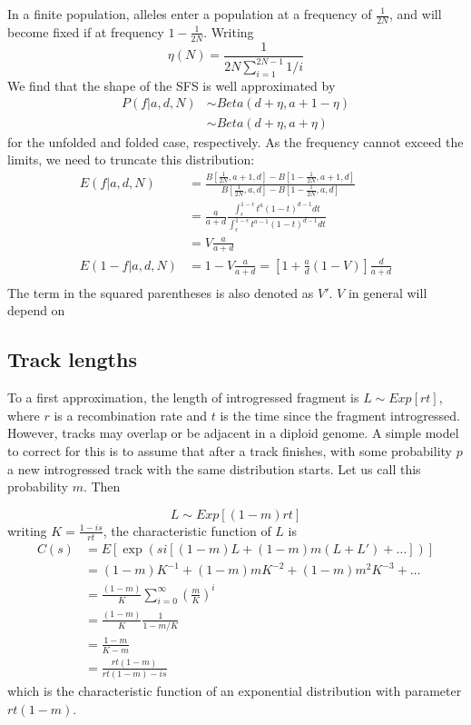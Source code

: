 \documentclass[10pt,a4paper]{article}
\begin{document}
In a finite population, alleles enter a population at a frequency of $\frac{1}{2N}$, and will become fixed if at frequency $1-\frac{1}{2N}$. Writing
$$\eta(N) = \frac{1}{2N \sum_{i=1}^{2N-1}1/i}$$
We find that the shape of the SFS is well approximated by 
\begin{align}
P(f | a, d, N) &\sim Beta(d + \eta, a+1 - \eta)\\
&\sim Beta(d + \eta, a + \eta)
\end{align}
for the unfolded and folded case, respectively. As the frequency cannot exceed the limits, we need to truncate this distribution:
\begin{align}
E(f | a, d, N) &= \frac{B[\frac{1}{2N}, a+1, d]-B[1-\frac{1}{2N}, a+1, d]}{B[\frac{1}{2N}, a, d]-B[1-\frac{1}{2N}, a, d]}\nonumber\\
&= \frac{a}{a+d} \frac{\int_\epsilon^{1-\epsilon} t^a(1-t)^{d-1}dt}
{\int_\epsilon^{1-\epsilon} t^{a-1}(1-t)^{d-1}dt}\nonumber\\
&= V \frac{a}{a+d}\\
E(1-f | a, d, N)&= 1-V\frac{a}{a+d} = \left[1 + \frac{a}{d} (1-V)\right] \frac{d}{a+d}\\
\end{align}
The term in the squared parentheses is also denoted as $V'$. $V$ in general will depend on 
		
\subsection{Track lengths}
To a first approximation, the length of introgressed fragment is 
$L \sim Exp[r t ]$, where $r$ is a recombination rate and $t$ is the time since the fragment introgressed. However, tracks may overlap or be adjacent in a diploid genome. A simple model to correct for this is to assume that after a track finishes, with some probability $p$ a new introgressed track with the same distribution starts. Let us call this probability $m$. Then

\begin{equation}
L \sim Exp[(1-m)rt]
\end{equation}
writing $K = \frac{1-is}{rt}$, the characteristic function of $L$ is
\begin{align}
C(s) &= E[\exp(si [(1-m)L + (1-m)m (L+L')+ \dots  ] )]\nonumber\\
&=(1-m) K^{-1} + (1-m)m K^{-2} +(1-m)m^2 K^{-3} + \dots\nonumber\\
&=\frac{(1-m)}{K} \sum_{i=0}^\infty \left(\frac{m}{K}\right)^{i} \nonumber\\
&= \frac{(1-m)}{K} \frac{1}{1 - m/K}\nonumber\\
&= \frac{1-m}{K-m}\nonumber\\
&= \frac{rt(1-m)}{rt (1-m) - is}\nonumber
\end{align}
which is the characteristic function of an exponential distribution with parameter $rt(1-m)$.
\end{document}
